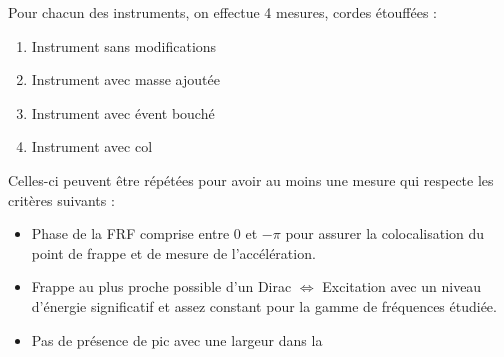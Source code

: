 \documentclass[atiam, article]{rapport} %
\begin{document}
Pour chacun des instruments, on effectue 4 mesures, cordes étouffées :
\begin{enumerate}
    \item Instrument sans modifications
    \item Instrument avec masse ajoutée
    \item Instrument avec évent bouché
    \item Instrument avec col
\end{enumerate}

Celles-ci peuvent être répétées pour avoir au moins une mesure qui respecte les critères suivants :

\begin{itemize}
    \item Phase de la FRF comprise entre $0$ et $-\pi$ pour assurer la colocalisation du point de frappe et de mesure de l'accélération.
    \item Frappe au plus proche possible d'un Dirac $\Leftrightarrow$ Excitation avec un niveau d'énergie significatif et assez constant pour la gamme de fréquences étudiée.
    \item Pas de présence de pic avec une largeur dans la 
\end{itemize}

\printbibliography
\end{document}
